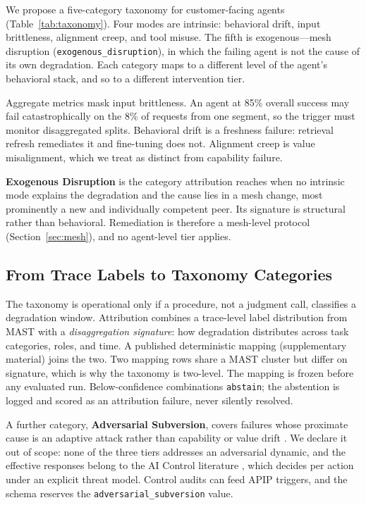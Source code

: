 \documentclass[conference]{IEEEtran}
\newcommand{\code}[1]{\texttt{\small #1}}
\begin{document}
We propose a five-category taxonomy for customer-facing agents
(Table~\ref{tab:taxonomy}). Four modes are intrinsic: behavioral drift, input
brittleness, alignment creep, and tool misuse. The fifth is exogenous---mesh
disruption (\code{exogenous\_disruption}), in which the failing agent is not
the cause of its own degradation. Each category maps to a different level
of the agent's behavioral stack, and so to a different intervention tier.

Aggregate metrics mask input brittleness. An agent at 85\% overall success may
fail catastrophically on the 8\% of requests from one segment, so the trigger
must monitor disaggregated splits. Behavioral drift is a freshness failure:
retrieval refresh remediates it and fine-tuning does not. Alignment creep is
value misalignment, which we treat as distinct from capability failure.

\textbf{Exogenous Disruption} is the category attribution reaches when no
intrinsic mode explains the degradation and the cause lies in a mesh change,
most prominently a new and individually competent peer. Its signature is
structural rather than behavioral. Remediation is therefore a mesh-level
protocol (Section~\ref{sec:mesh}), and no agent-level tier applies.

\subsection{From Trace Labels to Taxonomy Categories}
\label{sec:mapping}

The taxonomy is operational only if a procedure, not a judgment call,
classifies a degradation window. Attribution combines a trace-level label
distribution from MAST \cite{cemri2025} with a \emph{disaggregation signature}:
how degradation distributes across task categories, roles, and time. A
published deterministic mapping (supplementary material) joins the two. Two
mapping rows share a MAST cluster but differ on signature, which is why the
taxonomy is two-level. The mapping is frozen before any evaluated run.
Below-confidence combinations \code{abstain}; the abstention is logged and
scored as an attribution failure, never silently resolved.

A further category, \textbf{Adversarial Subversion}, covers failures whose
proximate cause is an adaptive attack rather than capability or value drift
\cite{bhatt2025, terekhov2025}. We declare it out of scope: none of the three
tiers addresses an adversarial dynamic, and the effective responses belong to
the AI Control literature \cite{greenblatt2023}, which decides per action under
an explicit threat model. Control audits
can feed APIP triggers, and the schema reserves the
\code{adversarial\_subversion} value.
\end{document}
